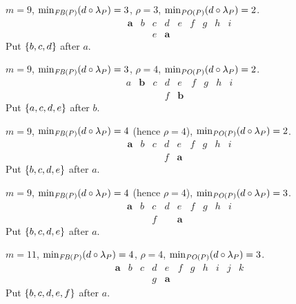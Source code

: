 \documentclass[pagesize, twoside=off, bibliography=totoc, DIV=calc, fontsize=12pt, a4paper]{scrartcl}
\begin{document}
\begin{example}
	$m = 9$, $\minineq[\FBP] = 3$, $\rho = 3$, $\minineq[\POP] = 2$.
	\begin{equation}
		\begin{array}{lllllllll}
			\bm{a}	& b	& c	& d	& e	& f	& g	& h	& i\\
			& & e & \bm{a}
		\end{array}
	\end{equation}
	Put $\{b, c, d\}$ after $a$.
\end{example}

\begin{example}
	$m = 9$, $\minineq[\FBP] = 3$, $\rho = 4$, $\minineq[\POP] = 2$.
	\begin{equation}
		\begin{array}{lllllllll}
			a	& \bm{b}	& c	& d	& e	& f	& g	& h	& i\\
			& & & f & \bm{b}
		\end{array}
	\end{equation}
	Put $\{a, c, d, e\}$ after $b$.
\end{example}

\begin{example}
	$m = 9$, $\minineq[\FBP] = 4$ (hence $\rho = 4$), $\minineq[\POP] = 2$.
	\begin{equation}
		\begin{array}{lllllllll}
			\bm{a}	& b	& c	& d	& e	& f	& g	& h	& i\\
			& & & f & \bm{a}
		\end{array}
	\end{equation}
	Put $\{b, c, d, e\}$ after $a$.
\end{example}

\begin{example}
	$m = 9$, $\minineq[\FBP] = 4$ (hence $\rho = 4$), $\minineq[\POP] = 3$.
	\begin{equation}
		\begin{array}{lllllllll}
			\bm{a}	& b	& c	& d	& e	& f	& g	& h	& i\\
			& & f & & \bm{a}
		\end{array}
	\end{equation}
	Put $\{b, c, d, e\}$ after $a$.
\end{example}

\begin{example}
	$m = 11$, $\minineq[\FBP] = 4$, $\rho = 4$, $\minineq[\POP] = 3$.
	\begin{equation}
		\begin{array}{lllllllllll}
			\bm{a}	& b	& c	& d	& e	& f	& g	& h	& i & j & k\\
			& & & g & \bm{a}
		\end{array}
	\end{equation}
	Put $\{b, c, d, e, f\}$ after $a$.
\end{example}
\end{document}
